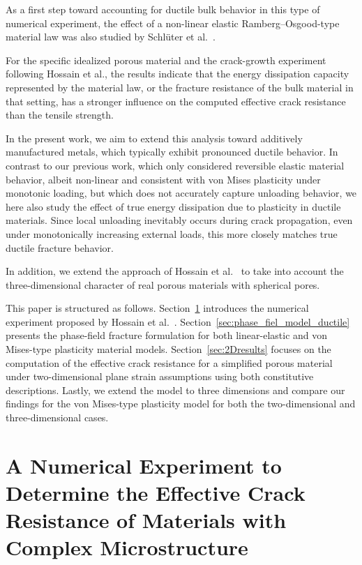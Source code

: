 \documentclass[pdflatex,sn-mathphys-num]{sn-jnl}%
\theoremstyle{thmstyleone}%
\theoremstyle{thmstyletwo}%
\theoremstyle{thmstylethree}%
\begin{document}
As a first step toward accounting for ductile bulk behavior in this type of numerical experiment,
the effect of a non-linear elastic Ramberg--Osgood-type material law was also studied by Schlüter et al.~\cite{schluter_influence_2025}.

For the specific idealized porous material and the crack-growth experiment following Hossain et al.,
the results indicate that the energy dissipation capacity represented by the material law,
or the fracture resistance of the bulk material in that setting,
has a stronger influence on the computed effective crack resistance than the tensile strength.

In the present work, we aim to extend this analysis
toward additively manufactured metals, which typically exhibit pronounced ductile behavior.
In contrast to our previous work, which only considered reversible elastic material behavior,
albeit non-linear and consistent with von Mises plasticity under monotonic loading,
but which does not accurately capture unloading behavior,
we here also study the effect of true energy dissipation due to plasticity in ductile materials.
Since local unloading inevitably occurs during crack propagation,
even under monotonically increasing external loads,
this more closely matches true ductile fracture behavior.

In addition, we extend the approach of Hossain et al.~\cite{hossain_effective_2014} to take into account the three-dimensional
character of real porous materials with spherical pores.

This paper is structured as follows.
Section~\ref{sec:numericalExperiment} introduces the numerical experiment
proposed by Hossain et al.~\cite{hossain_effective_2014}.
Section~\ref{sec:phase_fiel_model_ductile} presents the phase-field
fracture formulation for both linear-elastic and von Mises-type plasticity material models.
Section~\ref{sec:2Dresults} focuses on the computation
of the effective crack resistance for a simplified porous material
under two-dimensional plane strain assumptions
 using both constitutive descriptions.
Lastly, we extend the model to three dimensions and compare our findings for the von Mises-type plasticity model
for both the two-dimensional and three-dimensional cases.




\section{A Numerical Experiment to Determine the Effective Crack Resistance
 of Materials with Complex Microstructure}
\label{sec:numericalExperiment}
\end{document}

